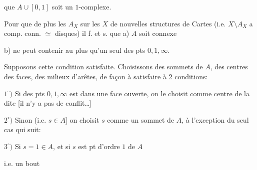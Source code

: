 que $A\cup[0,1]$ soit un $1$-complexe.

Pour que de plus les $A_X$ 
sur les $X$ de nouvelles structures de
Cartes (i.e. $X\setminus A_X$ a comp. conn. $\simeq$ disques)
il f. et s. que a) $A$ soit connexe
\par
{}\par
{}\par
{}\par
{}

b)    
ne peut contenir au plus qu'un seul
des pts $0,1,\infty$.

Supposons cette condition satisfaite. Choisissons
des sommets de $A$,  des centres des
faces, des milieux d'arêtes, de façon
à satisfaire à $2$ conditions:

$1^\circ)$ Si  des pts $0,1,\infty$ est dans une
face ouverte, on le choisit comme
centre de la dite [il n'y a pas de conflit\ldots]

$2^\circ)$ Sinon (i.e.  $s\in A$] on choisit $s$
comme un sommet de $A$,  à l'exception
du seul cas qui suit:

$3^\circ)$ Si $s=1\in A$, et si $s$ est   pt
d'ordre $1$ de $A$\par
i.e. un bout
